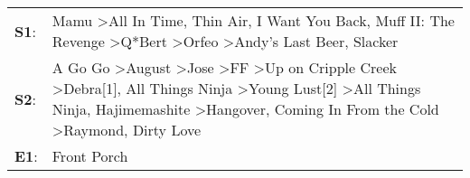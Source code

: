 \begin{supertabular}{p{0.03\textwidth}p{0.92\textwidth}}
 \textbf{S1}:  &                                                                                                                                                                                                                                                                           Mamu\textsuperscript{} \textgreater \enspace All In Time\textsuperscript{}, \enspace Thin Air\textsuperscript{}, \enspace I Want You Back\textsuperscript{}, \enspace Muff II: The Revenge\textsuperscript{} \textgreater \enspace Q*Bert\textsuperscript{} \textgreater \enspace Orfeo\textsuperscript{} \textgreater \enspace Andy's Last Beer\textsuperscript{}, \enspace Slacker\textsuperscript{}  \enspace  \\
 \textbf{S2}:  &  A Go Go\textsuperscript{} \textgreater \enspace August\textsuperscript{} \textgreater \enspace Jose\textsuperscript{} \textgreater \enspace FF\textsuperscript{} \textgreater \enspace Up on Cripple Creek\textsuperscript{} \textgreater \enspace Debra[1]\textsuperscript{}, \enspace All Things Ninja\textsuperscript{} \textgreater \enspace Young Lust[2]\textsuperscript{} \textgreater \enspace All Things Ninja\textsuperscript{}, \enspace Hajimemashite\textsuperscript{} \textgreater \enspace Hangover\textsuperscript{}, \enspace Coming In From the Cold\textsuperscript{} \textgreater \enspace Raymond\textsuperscript{}, \enspace Dirty Love\textsuperscript{}  \enspace  \\
 \textbf{E1}:  &                                                                                                                                                                                                                                                                                                                                                                                                                                                                                                                                                                                                                                                    Front Porch\textsuperscript{}  \enspace  \\
\end{supertabular}
